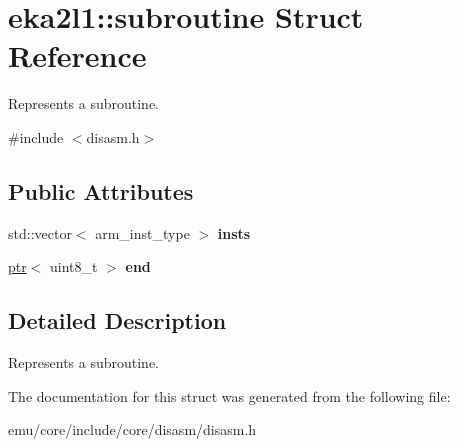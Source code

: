 \hypertarget{structeka2l1_1_1subroutine}{}\section{eka2l1\+:\+:subroutine Struct Reference}
\label{structeka2l1_1_1subroutine}


Represents a subroutine.  




{\ttfamily \#include $<$disasm.\+h$>$}

\subsection*{Public Attributes}
\begin{DoxyCompactItemize}
\item 
\mbox{\label{structeka2l1_1_1subroutine_a2fd571265ef45b15b57f462b0bf5ad77}} 
std\+::vector$<$ arm\+\_\+inst\+\_\+type $>$ {\bfseries insts}
\item 
\mbox{\label{structeka2l1_1_1subroutine_a5d79d75788172fd49276c72c2f4914c5}} 
\mbox{\hyperlink{classeka2l1_1_1ptr}{ptr}}$<$ uint8\+\_\+t $>$ {\bfseries end}
\end{DoxyCompactItemize}


\subsection{Detailed Description}
Represents a subroutine. 

The documentation for this struct was generated from the following file\+:\begin{DoxyCompactItemize}
\item 
emu/core/include/core/disasm/disasm.\+h\end{DoxyCompactItemize}
